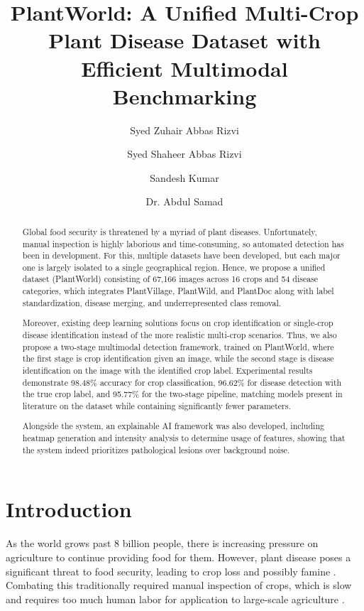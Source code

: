 \documentclass[runningheads]{llncs}
\title{PlantWorld: A Unified Multi-Crop Plant Disease Dataset with Efficient Multimodal Benchmarking}
\author{
  Syed Zuhair Abbas Rizvi\inst{1}\orcidlink{0000-0000-0000-0000} \and
  Syed Shaheer Abbas Rizvi\inst{1}\orcidlink{0000-0000-0000-0000} \and
  Sandesh Kumar\inst{1}\orcidlink{0000-0000-0000-0000} \and
  Dr. Abdul Samad\inst{1}\orcidlink{0000-0000-0000-0000}
}
\institute{
  Habib University, Karachi, Pakistan \\
  \email{\{sr07889, sr07888, sandesh.kumar, abdul.samad\}@habib.edu.pk}
}
\begin{document}
\maketitle

\begin{abstract}
Global food security is threatened by a myriad of plant diseases. Unfortunately, manual inspection is highly laborious and time-consuming, so automated detection has been in development. For this, multiple datasets have been developed, but each major one is largely isolated to a single geographical region. Hence, we propose a unified dataset (PlantWorld) consisting of 67,166 images across 16 crops and 54 disease categories, which integrates PlantVillage, PlantWild, and PlantDoc along with label standardization, disease merging, and underrepresented class removal. 

Moreover, existing deep learning solutions focus on crop identification or single-crop disease identification instead of the more realistic multi-crop scenarios. Thus, we also propose a two-stage multimodal detection framework, trained on PlantWorld, where the first stage is crop identification given an image, while the second stage is disease identification on the image with the identified crop label. Experimental results demonstrate 98.48\% accuracy for crop classification, 96.62\% for disease detection with the true crop label, and 95.77\% for the two-stage pipeline, matching models present in literature on the dataset while containing significantly fewer parameters. 

Alongside the system, an explainable AI framework was also developed, including heatmap generation and intensity analysis to determine usage of features, showing that the system indeed prioritizes pathological lesions over background noise. 

\end{abstract}

\section{Introduction}
\label{sec:intro}

As the world grows past 8 billion people, there is increasing pressure on agriculture to continue providing food for them. However, plant disease poses a significant threat to food security, leading to crop loss and possibly famine \cite{ristaino2021persistent}. Combating this traditionally required manual inspection of crops, which is slow and requires too much human labor for application to large-scale agriculture \cite{li2021}. 
\end{document}
